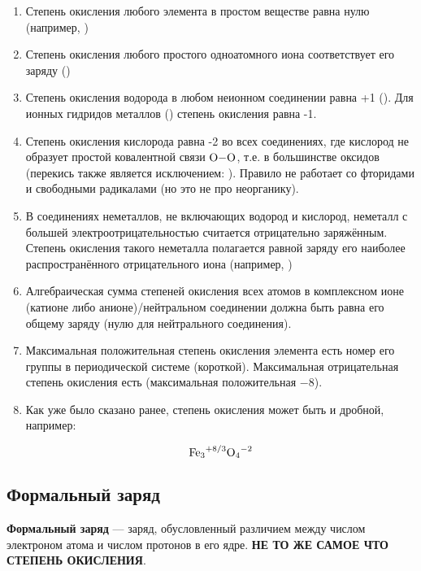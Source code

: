 \begin{enumerate}
	\item Степень окисления любого элемента в простом веществе равна нулю (например, )
	
	\item Степень окисления любого простого одноатомного иона соответствует его заряду ()
	
	\item Степень окисления водорода в любом неионном соединении равна +1 (). Для ионных гидридов металлов () степень окисления равна -1.
	
	\item Степень окисления кислорода равна -2 во всех соединениях, где кислород не образует простой ковалентной связи $\ce{O-O}$, т.е. в большинстве оксидов (перекись также является исключением: ). Правило не работает со фторидами и свободными радикалами (но это не про неорганику).
	
	\item В соединениях неметаллов, не включающих водород и кислород, неметалл с большей электроотрицательностью считается отрицательно заряжённым. Степень окисления такого неметалла полагается равной заряду его наиболее распространённого отрицательного иона (например, )
	
	\item Алгебраическая сумма степеней окисления всех атомов в комплексном ионе (катионе либо анионе)/нейтральном соединении должна быть равна его общему заряду (нулю для нейтрального соединения).
	
	\item Максимальная положительная степень окисления элемента есть номер его группы в периодической системе (короткой). Максимальная отрицательная степень окисления есть (максимальная положительная $-8$).
	
	\item Как уже было сказано ранее, степень окисления может быть и дробной, например:
	
	\begin{equation*}
		\ce{Fe3^{+8/3}O4^{-2}}
	\end{equation*}
\end{enumerate}

\subsection{Формальный заряд}

\textbf{Формальный заряд} --- заряд, обусловленный различием между числом электроном атома и числом протонов в его ядре. \textbf{НЕ ТО ЖЕ САМОЕ ЧТО СТЕПЕНЬ ОКИСЛЕНИЯ}.

